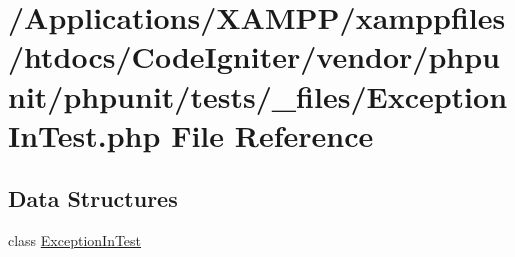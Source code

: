 \hypertarget{_exception_in_test_8php}{}\section{/\+Applications/\+X\+A\+M\+P\+P/xamppfiles/htdocs/\+Code\+Igniter/vendor/phpunit/phpunit/tests/\+\_\+files/\+Exception\+In\+Test.php File Reference}
\label{_exception_in_test_8php}
\subsection*{Data Structures}
\begin{DoxyCompactItemize}
\item 
class \mbox{\hyperlink{class_exception_in_test}{Exception\+In\+Test}}
\end{DoxyCompactItemize}
